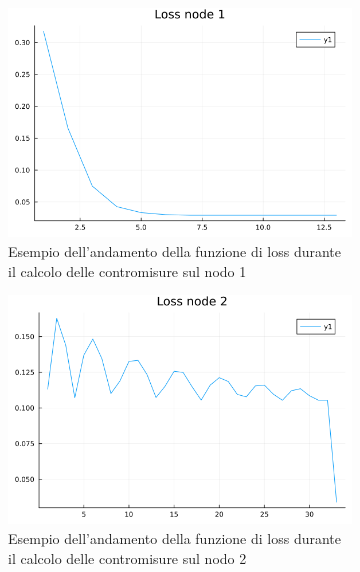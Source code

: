 \begin{figure}[!hb]
	\centering
	\begin{subfigure}[b]{0.45\textwidth}
		\centering
		\includegraphics[width=\textwidth]{img/loss1.png}
		\caption{Esempio dell'andamento della funzione di loss durante il calcolo delle contromisure sul nodo 1}
		\label{fig:loss1}
	\end{subfigure}
	\hfill
	\begin{subfigure}[b]{0.45\textwidth}
		\centering
		\includegraphics[width=\textwidth]{img/loss2.png}
		\caption{Esempio dell'andamento della funzione di loss durante il calcolo delle contromisure sul nodo 2}
		\label{fig:loss2}
	\end{subfigure}
	\hfill
	\begin{subfigure}[b]{0.45\textwidth}
		\centering

\end{subfigure}
\end{figure}
